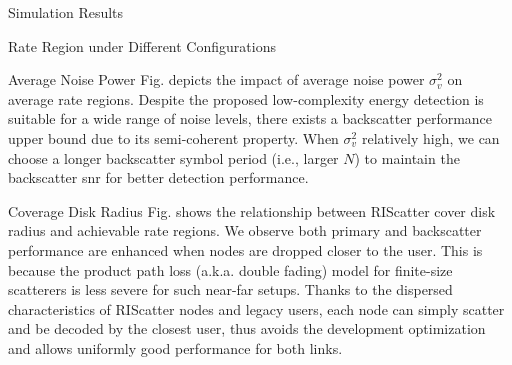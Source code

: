 \documentclass[journal]{IEEEtran}
\begin{document}
\begin{section}{Simulation Results}
\begin{subsection}{Rate Region under Different Configurations}
		\begin{subsubsection}{Average Noise Power}
			Fig.  depicts the impact of average noise power $\sigma_v^2$ on average rate regions.
			Despite the proposed low-complexity energy detection is suitable for a wide range of noise levels, there exists a backscatter performance upper bound due to its semi-coherent property.
			When $\sigma_v^2$ relatively high, we can choose a longer backscatter symbol period (i.e., larger $N$) to maintain the backscatter \gls{snr} for better detection performance.
		\end{subsubsection}

		\begin{subsubsection}{Coverage Disk Radius}
			Fig.  shows the relationship between RIScatter cover disk radius and achievable rate regions.
			We observe both primary and backscatter performance are enhanced when nodes are dropped closer to the user.
			This is because the product path loss (a.k.a. double fading) model for finite-size scatterers is less severe for such near-far setups.
			Thanks to the dispersed characteristics of RIScatter nodes and legacy users, each node can simply scatter and be decoded by the closest user, thus avoids the development optimization and allows uniformly good performance for both links.
		\end{subsubsection}
	\end{subsection}
	\label{st:simulation_results}
\end{section}
\end{document}
